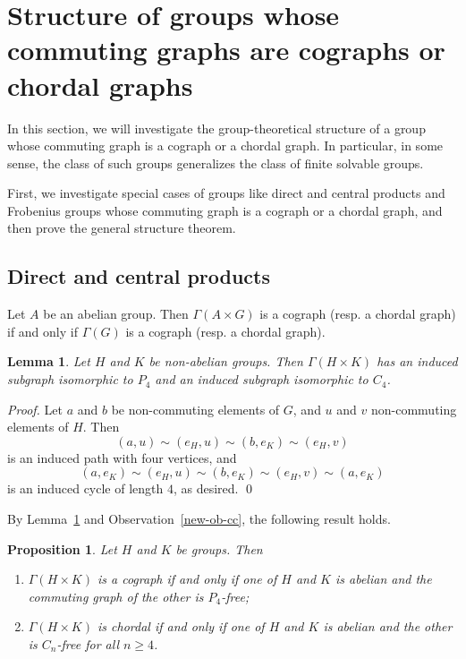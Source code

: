 \documentclass{elsarticle}
\newtheorem{prop}[theorem]{Proposition}
\newtheorem{lemma}[theorem]{Lemma}
\begin{document}
\section{Structure of groups whose commuting graphs are cographs or chordal graphs}\label{Structure}


In this section, we will investigate the group-theoretical structure
of a group whose commuting graph is a cograph or a chordal graph.  In
particular, in some sense, the class of such groups generalizes the
class of finite solvable groups.

First, we investigate special cases of groups like direct and central
products and Frobenius groups whose commuting graph is a cograph or a
chordal graph, and then prove the general structure theorem.

\subsection{Direct and central products}

\begin{obs}\label{new-ob-cc}
Let $A$ be an abelian group. Then $\Gamma(A\times G)$ is a cograph {\rm(}resp. a chordal graph{\rm)} if and only if $\Gamma(G)$  is a cograph {\rm(}resp. a chordal graph{\rm)}.
\end{obs}

\begin{lemma}\label{zj-cg}
Let $H$ and $K$ be non-abelian groups.
Then $\Gamma(H\times K)$ has an induced subgraph isomorphic to $P_4$ and an induced subgraph isomorphic to $C_4$.
\end{lemma}

\begin{proof}
Let $a$ and $b$ be non-commuting elements of $G$, and $u$ and $v$
non-commuting elements of $H$. Then
$$
(a,u)\sim (e_H,u) \sim (b,e_K) \sim (e_H,v)
$$
is an induced path with four vertices, and
$$
(a,e_K)\sim (e_H,u) \sim (b,e_K) \sim (e_H,v) \sim (a,e_K)
$$
is an induced cycle of length $4$, as desired. \qed
\end{proof}

By Lemma~\ref{zj-cg} and Observation~\ref{new-ob-cc}, the following result holds.

\begin{prop}\label{zj-thm}
Let $H$ and $K$ be groups. Then
\begin{enumerate}
\item $\Gamma(H\times K)$ is  a cograph if and only if one of $H$ and $K$ is abelian and the commuting graph of the other is $P_4$-free;
\item $\Gamma(H\times K)$ is chordal if and only if one of $H$ and $K$ is abelian and the other is $C_n$-free for all $n\ge 4$.
\end{enumerate}
\end{prop}
\end{document}
